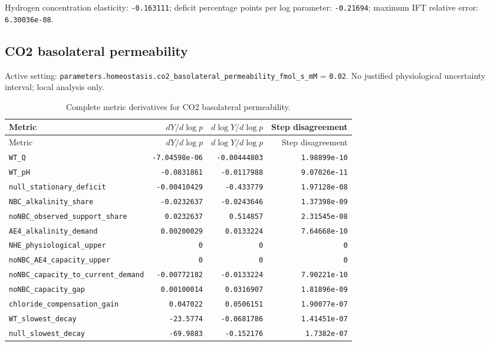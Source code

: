 Hydrogen concentration elasticity: \texttt{-0.163111}; deficit percentage points per log parameter: \texttt{-0.21694}; maximum IFT relative error: \texttt{6.30036e-08}.\par

\subsection*{CO2 basolateral permeability}
Active setting: \nolinkurl{parameters.homeostasis.co2_basolateral_permeability_fmol_s_mM} = \texttt{0.02}. No justified physiological uncertainty interval; local analysis only.


\begingroup\scriptsize
\setlength{\tabcolsep}{3pt}
\begin{longtable}{p{.44\linewidth}rrr}
\caption{Complete metric derivatives for CO2 basolateral permeability.}\\
\toprule
Metric & $dY/d\log p$ & $d\log Y/d\log p$ & Step disagreement \\
\midrule\endfirsthead
\toprule
Metric & $dY/d\log p$ & $d\log Y/d\log p$ & Step disagreement \\
\midrule\endhead
\bottomrule\endfoot
\nolinkurl{WT_Q} & \texttt{-7.04598e-06} & \texttt{-0.00444803} & \texttt{1.98899e-10} \\
\nolinkurl{WT_pH} & \texttt{-0.0831861} & \texttt{-0.0117988} & \texttt{9.07026e-11} \\
\nolinkurl{null_stationary_deficit} & \texttt{-0.00410429} & \texttt{-0.433779} & \texttt{1.97128e-08} \\
\nolinkurl{NBC_alkalinity_share} & \texttt{-0.0232637} & \texttt{-0.0243646} & \texttt{1.37398e-09} \\
\nolinkurl{noNBC_observed_support_share} & \texttt{0.0232637} & \texttt{0.514857} & \texttt{2.31545e-08} \\
\nolinkurl{AE4_alkalinity_demand} & \texttt{0.00200029} & \texttt{0.0133224} & \texttt{7.64668e-10} \\
\nolinkurl{NHE_physiological_upper} & \texttt{0} & \texttt{0} & \texttt{0} \\
\nolinkurl{noNBC_AE4_capacity_upper} & \texttt{0} & \texttt{0} & \texttt{0} \\
\nolinkurl{noNBC_capacity_to_current_demand} & \texttt{-0.00772182} & \texttt{-0.0133224} & \texttt{7.90221e-10} \\
\nolinkurl{noNBC_capacity_gap} & \texttt{0.00100014} & \texttt{0.0316907} & \texttt{1.81896e-09} \\
\nolinkurl{chloride_compensation_gain} & \texttt{0.047022} & \texttt{0.0506151} & \texttt{1.90077e-07} \\
\nolinkurl{WT_slowest_decay} & \texttt{-23.5774} & \texttt{-0.0681786} & \texttt{1.41451e-07} \\
\nolinkurl{null_slowest_decay} & \texttt{-69.9883} & \texttt{-0.152176} & \texttt{1.7382e-07} \\
\end{longtable}
\endgroup

